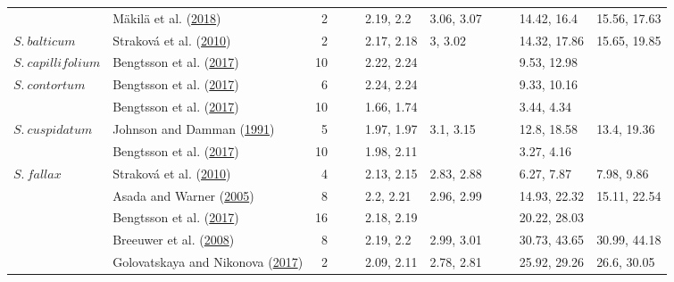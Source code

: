 \documentclass[
  12pt,
]{article}
\begin{document}
\begin{table}[H]
{\begin{tabular}[t]{llrllllllll}
 & Mäkilä et al. (\protect\hyperlink{ref-Makila.2018}{2018}) & 2 &  &  & 2.19, 2.2 & 3.06, 3.07 &  &  & 14.42, 16.4 & 15.56, 17.63\\

\multirow[t]{-4}{*}{\raggedright\arraybackslash $S.~balticum$} & Straková et al. (\protect\hyperlink{ref-Strakova.2010}{2010}) & 2 &  &  & 2.17, 2.18 & 3, 3.02 &  &  & 14.32, 17.86 & 15.65, 19.85\\
\cmidrule{1-11}
$S.~capillifolium$ & Bengtsson et al. (\protect\hyperlink{ref-Bengtsson.2017}{2017}) & 10 &  &  & 2.22, 2.24 &  &  &  & 9.53, 12.98 & \\
\cmidrule{1-11}
$S.~contortum$ & Bengtsson et al. (\protect\hyperlink{ref-Bengtsson.2017}{2017}) & 6 &  &  & 2.24, 2.24 &  &  &  & 9.33, 10.16 & \\
\cmidrule{1-11}
 & Bengtsson et al. (\protect\hyperlink{ref-Bengtsson.2017}{2017}) & 10 &  &  & 1.66, 1.74 &  &  &  & 3.44, 4.34 & \\

\multirow[t]{-2}{*}{\raggedright\arraybackslash $S.~cuspidatum$} & Johnson and Damman (\protect\hyperlink{ref-Johnson.1991}{1991}) & 5 &  &  & 1.97, 1.97 & 3.1, 3.15 &  &  & 12.8, 18.58 & 13.4, 19.36\\
\cmidrule{1-11}
 & Bengtsson et al. (\protect\hyperlink{ref-Bengtsson.2017}{2017}) & 10 &  &  & 1.98, 2.11 &  &  &  & 3.27, 4.16 & \\

\multirow[t]{-2}{*}{\raggedright\arraybackslash $S.~fallax$} & Straková et al. (\protect\hyperlink{ref-Strakova.2010}{2010}) & 4 &  &  & 2.13, 2.15 & 2.83, 2.88 &  &  & 6.27, 7.87 & 7.98, 9.86\\
\cmidrule{1-11}
 & Asada and Warner (\protect\hyperlink{ref-Asada.2005b}{2005}) & 8 &  &  & 2.2, 2.21 & 2.96, 2.99 &  &  & 14.93, 22.32 & 15.11, 22.54\\

 & Bengtsson et al. (\protect\hyperlink{ref-Bengtsson.2017}{2017}) & 16 &  &  & 2.18, 2.19 &  &  &  & 20.22, 28.03 & \\

 & Breeuwer et al. (\protect\hyperlink{ref-Breeuwer.2008}{2008}) & 8 &  &  & 2.19, 2.2 & 2.99, 3.01 &  &  & 30.73, 43.65 & 30.99, 44.18\\

 & Golovatskaya and Nikonova (\protect\hyperlink{ref-Golovatskaya.2017}{2017}) & 2 &  &  & 2.09, 2.11 & 2.78, 2.81 &  &  & 25.92, 29.26 & 26.6, 30.05\\


\end{tabular}}
\end{table}
\end{document}
